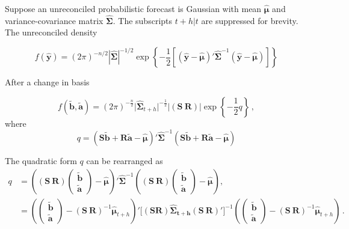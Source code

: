 \documentclass[a4paper, 11pt]{article}
\def\bt{\begin{pmatrix}\tilde{\bm{b}}\\[-0.2cm]\tilde{\bm{a}}\end{pmatrix}}
\theoremstyle{theo}
\theoremstyle{definition}
\begin{document}
Suppose an unreconciled probabilistic forecast is Gaussian with mean $\hat{\bm \mu}$ and variance-covariance matrix $\hat{\bm \Sigma}$.  The subscripts $t+h|t$ are suppressed for brevity.  The unreconciled density

\begin{equation}
  f(\hat{\bm{y}})=(2\pi)^{-n/2}|\hat{\bm{\Sigma}}|^{-1/2}\exp\left\{-\frac{1}{2}\left[(\hat{\bm y}-\hat{\bm \mu})'\hat{\bm{\Sigma}}^{-1}(\hat{\bm y}-\hat{\bm \mu})\right]\right\}
\end{equation}

After a change in basis

\begin{equation}
f(\tilde{\bm b},\tilde{\bm a})=(2\pi)^{-\frac{n}{2}}\Big|\bm{\hat{\Sigma}}_{t+h}\Big|^{-\frac{1}{2}}\Big|(\bm{S} ~  \bm{R})\Big|\exp\left\{-\frac{1}{2}q\right\}\,,
\end{equation}
where
\begin{equation}
q=(\bm{S}\tilde{\bm{b}}+\bm{R}\tilde{\bm{a}}-\bm{\hat{\mu}})' \bm{\hat{\Sigma}}^{-1}(\bm{S}\tilde{\bm{b}}+\bm{R}\tilde{\bm{a}}-\bm{\hat{\mu}})
\end{equation}


The quadratic form $q$ can be rearranged as
\begin{align*}
q& = 
\left((\bm{S} ~  \bm{R})\bt-\bm{\hat{\mu}}\right)' \bm{\hat{\Sigma}}^{-1}\left((\bm{S} ~ \bm{R})\bt-\bm{\hat{\mu}}\right),\\
& =
\left(\bt-(\bm{S} ~ \bm{R})^{-1}\bm{\hat{\mu}}_{t+h}\right)' \Big[(\bm{S}  \bm{R})\bm{\hat{\Sigma}_{t+h}}(\bm{S} ~ \bm{R})'\Big]^{-1}
\left(\bt-(\bm{S} ~ \bm{R})^{-1}\bm{\hat{\mu}}_{t+h}\right)\,.
\end{align*}
\end{document}
